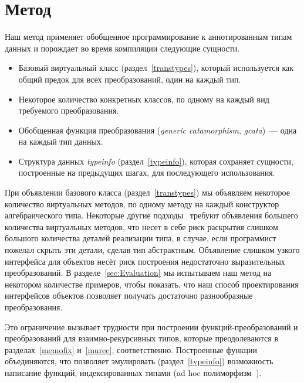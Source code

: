\section{Метод}
\label{sec:implementation}

Наш метод применяет обобщенное программирование к аннотированным  типам данных и порождает во время компиляции следующие сущности.

\begin{itemize}
\item Базовый виртуальный класс (раздел~\ref{transtypes}), который используется как общий предок для всех преобразований, один на каждый тип. 

\item Некоторое количество конкретных классов, по одному на каждый вид требуемого преобразования.

\item Обобщенная функция преобразования (\emph{generic catamorphism}, \emph{gcata})~--- одна на каждый тип данных.

\item Структура данных \emph{typeinfo} (раздел~\ref{typeinfo}), которая сохраняет сущности, построенные на предыдущих шагах, для последующего использования.
\end{itemize}


При объявлении базового класса (раздел~\ref{transtypes})
мы объявляем некоторое количество виртуальных методов, по одному методу на каждый конструктор алгебраического типа. Некоторые другие подходы~\cite{Visitors} требуют объявления большего количества виртуальных методов, что несет в себе риск раскрытия слишком большого количества деталей реализации типа, в случае, если программист пожелал скрыть эти детали, сделав тип абстрактным. Объявление слишком узкого интерфейса для объектов несёт риск построения недостаточно выразительных преобразований. В разделе~\ref{sec:Evaluation} мы испытываем наш метод на некотором количестве примеров, чтобы показать, что наш способ проектирования интерфейсов объектов позволяет получать достаточно разнообразные преобразования.


Это ограничение вызывает трудности при построении функций-преобразований и преобразований для взаимно-рекурсивных типов, которые преодолеваются в разделах~\ref{memofix} и~\ref{murec}, соответственно. Построенные функции объединяются, что позволяет эмулировать (раздел~\ref{typeinfo}) возможность написание функций, индексированных типами (ad hoc полиморфизм~\cite{cardelli}).

